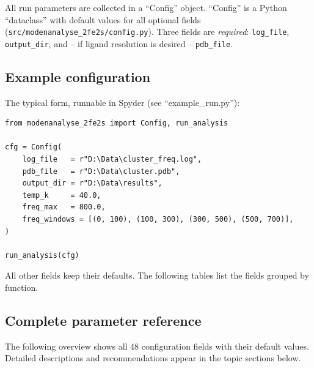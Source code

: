 \documentclass[11pt,a4paper,twoside]{article}
\theoremstyle{remark}
\begin{document}
All run parameters are collected in a ``Config'' object.
``Config'' is a Python ``dataclass'' with default values for all
optional fields (\texttt{src/modenanalyse\_2fe2s/config.py}). Three
fields are \emph{required}: \texttt{log\_file}, \texttt{output\_dir},
and -- if ligand resolution is desired -- \texttt{pdb\_file}.

\subsection{Example configuration}

The typical form, runnable in Spyder (see ``example\_run.py''):

\begin{lstlisting}[style=python]
from modenanalyse_2fe2s import Config, run_analysis

cfg = Config(
    log_file   = r"D:\Data\cluster_freq.log",
    pdb_file   = r"D:\Data\cluster.pdb",
    output_dir = r"D:\Data\results",
    temp_k     = 40.0,
    freq_max   = 800.0,
    freq_windows = [(0, 100), (100, 300), (300, 500), (500, 700)],
)

run_analysis(cfg)
\end{lstlisting}

All other fields keep their defaults. The following tables list
the fields grouped by function.

\subsection{Complete parameter reference}
\label{sec:param-referenz}

The following overview shows all 48 configuration fields with
their default values. Detailed descriptions and recommendations
appear in the topic sections below.
\end{document}
